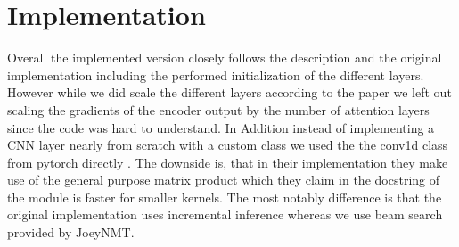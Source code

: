 \documentclass[11pt]{article}
\begin{document}
\section{Implementation}
Overall the implemented version closely follows the description and the original implementation including the performed initialization of the different layers. 
However while we did scale the different layers according to the paper we left out scaling the gradients of the encoder output by the number of attention layers since the code was hard to understand. 
In Addition instead of  implementing a CNN layer nearly from scratch with a custom class we used the the conv1d class from pytorch directly .
The downside is, that in their implementation they make use of  the general purpose matrix product which they claim in the docstring of the module is faster for smaller kernels.
The most notably difference is that the original implementation uses incremental inference whereas we use beam search provided by JoeyNMT. 
\newpage 

\end{document}
